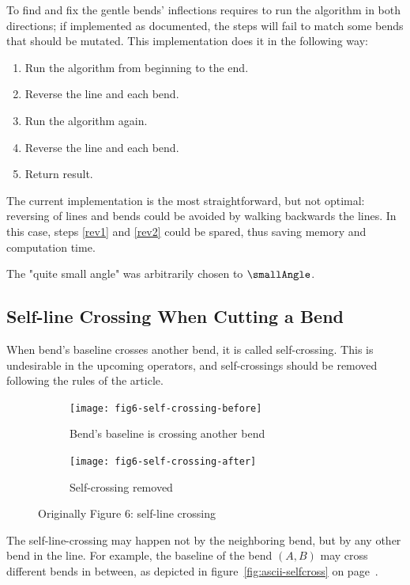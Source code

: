 \documentclass[a4paper]{article}
\newcommand{\onpage}[1]{\ref{#1} on page~\pageref{#1}}
\begin{document}
To find and fix the gentle bends' inflections requires to run the algorithm in
both directions; if implemented as documented, the steps will fail to match
some bends that should be mutated. This implementation does it in the following
way:

\begin{enumerate}
    \item Run the algorithm from beginning to the end.
    \item \label{rev1} Reverse the line and each bend.
    \item Run the algorithm again.
    \item \label{rev2} Reverse the line and each bend.
    \item Return result.
\end{enumerate}

The current implementation is the most straightforward, but not optimal:
reversing of lines and bends could be avoided by walking backwards the lines.
In this case, steps \ref{rev1} and \ref{rev2} could be spared, thus saving
memory and computation time.

The "quite small angle" was arbitrarily chosen to $\smallAngle$.

\subsection{Self-line Crossing When Cutting a Bend}

When bend's baseline crosses another bend, it is called self-crossing. This is
undesirable in the upcoming operators, and self-crossings should be removed
following the rules of the article.

\begin{figure}[h]
    \centering
    \begin{subfigure}[b]{.4\textwidth}
        \texttt{[image: fig6-self-crossing-before]}
        \caption{Bend's baseline is crossing another bend}
    \end{subfigure}
    \hfill
    \begin{subfigure}[b]{.4\textwidth}
        \texttt{[image: fig6-self-crossing-after]}
        \caption{Self-crossing removed}
    \end{subfigure}
    \caption{Originally Figure 6: self-line crossing}
    \label{fig:fig6-self-crossing}
\end{figure}

The self-line-crossing may happen not by the neighboring bend, but by any other
bend in the line. For example, the baseline of the bend $(A, B)$ may cross
different bends in between, as depicted in figure~\onpage{fig:ascii-selfcross}.
\end{document}
